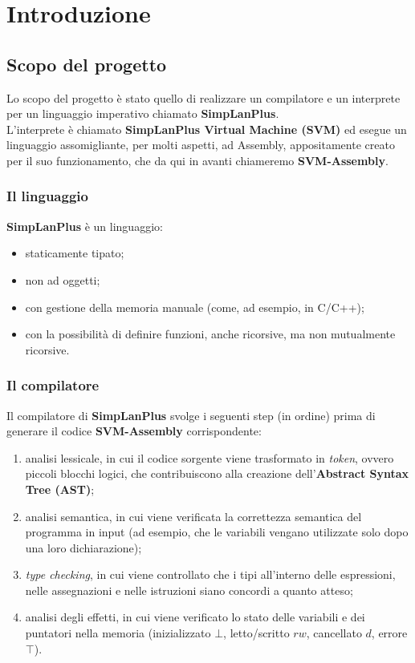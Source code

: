 \documentclass[../report.tex]{subfiles}
\begin{document}
\chapter{Introduzione}\label{c:introduzione}
\section{Scopo del progetto}\label{s:scopo-progetto}
Lo scopo del progetto è stato quello di realizzare un compilatore e un interprete per un linguaggio imperativo chiamato \textbf{SimpLanPlus}.\\
\noindent
L'interprete è chiamato \textbf{SimpLanPlus Virtual Machine (SVM)} ed esegue un linguaggio assomigliante, per molti aspetti, ad Assembly, appositamente creato per il suo funzionamento, che da qui in avanti chiameremo \textbf{SVM-Assembly}.

\subsection{Il linguaggio}\label{ss:linguaggio}
\textbf{SimpLanPlus} è un linguaggio:
\begin{itemize}
    \item staticamente tipato;
    \item non ad oggetti;
    \item con gestione della memoria manuale (come, ad esempio, in C/C++);
    \item con la possibilità di definire funzioni, anche ricorsive, ma non mutualmente ricorsive.
\end{itemize}

\subsection{Il compilatore}\label{ss:compilatore}
Il compilatore di \textbf{SimpLanPlus} svolge i seguenti step (in ordine) prima di generare il codice \textbf{SVM-Assembly} corrispondente:
\begin{enumerate}
    \item analisi lessicale, in cui il codice sorgente viene trasformato in \textit{token}, ovvero piccoli blocchi logici, che contribuiscono alla creazione dell'\textbf{Abstract Syntax Tree (AST)};
    \item analisi semantica, in cui viene verificata la correttezza semantica del programma in input (ad esempio, che le variabili vengano utilizzate solo dopo una loro dichiarazione);
    \item \textit{type checking}, in cui viene controllato che i tipi all'interno delle espressioni, nelle assegnazioni e nelle istruzioni siano concordi a quanto atteso;
    \item analisi degli effetti, in cui viene verificato lo stato delle variabili e dei puntatori nella memoria (inizializzato $\bot$, letto/scritto $rw$, cancellato $d$, errore $\top$).
\end{enumerate}
\end{document}
